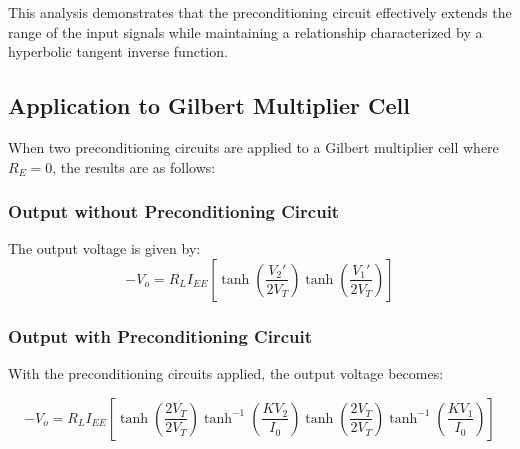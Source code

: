 \documentclass[a4paper,9pt,twoside,openany,twocolumn]{memoir}
\begin{document}
This analysis demonstrates that the preconditioning circuit effectively extends the range of the input signals while maintaining a relationship characterized by a hyperbolic tangent inverse function.
\begin{center}
\begin{figure}[h!]
\centering
{}
\end{figure}
\end{center}
\subsection{Application to Gilbert Multiplier Cell}

When two preconditioning circuits are applied to a Gilbert multiplier cell where \( R_E = 0 \), the results are as follows:

\subsubsection{Output without Preconditioning Circuit}
The output voltage is given by:
\begin{equation}
-V_o = R_L I_{EE} \left[\tanh\left(\frac{V_2'}{2V_T}\right) \tanh\left(\frac{V_1'}{2V_T}\right)\right] \tag{1}
\end{equation}

\subsubsection{Output with Preconditioning Circuit}
With the preconditioning circuits applied, the output voltage becomes:

\begin{equation}
-V_o = R_L I_{EE} \left[ \tanh \left( \frac{2V_T}{2V_T} \right) \tanh^{-1} \left( \frac{K V_2}{I_0} \right) \tanh \left( \frac{2V_T}{2V_T} \right) \tanh^{-1} \left( \frac{K V_1}{I_0} \right) \right] \tag{2}
\end{equation}
\end{document}
